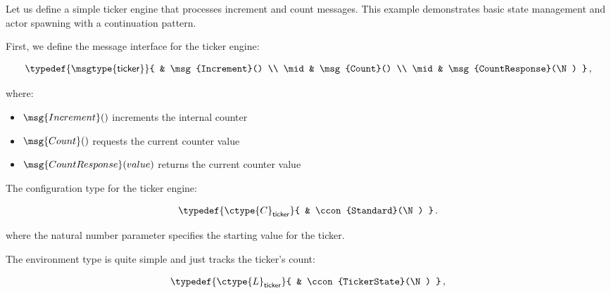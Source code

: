 \begin{example}\label{ex:ticker-engine}%
    Let us define a simple ticker engine that processes increment and count
    messages. This example demonstrates basic state management and actor
    spawning with a continuation pattern.
    
    First, we define the message interface for the ticker engine:
    
    \begin{equation}\label{eq:ticker-message-interface}
    \begin{aligned}
    \typedef%
    {
      \msgtype{\mathsf{ticker}}
    }{    &  \msg{Increment}() \\
    \mid &  \msg{Count}() \\
    \mid &  \msg{CountResponse}(\N)
    }\,,
    \end{aligned}
    \end{equation}
    
    where:
    \begin{itemize}
        \item $\msg{Increment}()$ increments the internal counter
        \item $\msg{Count}()$ requests the current counter value
        \item $\msg{CountResponse}(value)$ returns the current counter value
    \end{itemize}
    
    The configuration type for the ticker engine:
    
    \begin{equation}\label{eq:ticker-configuration}
    \begin{aligned}
    \typedef{%
      \ctype{C}_{\mathsf{ticker}}
    }{    &  \ccon{Standard}(\N) 
    }\,.
    \end{aligned}
    \end{equation}
    
    where the natural number parameter specifies the starting value for the
    ticker.
    
    The environment type is quite simple and just tracks the ticker's count:
    
    \begin{equation}\label{eq:ticker-environment}
    \begin{aligned}
    \typedef{%
      \ctype{L}_{\mathsf{ticker}}
    }{    &  \ccon{TickerState}(\N)
    }\,,
    \end{aligned}
    \end{equation}
    

\end{example}
